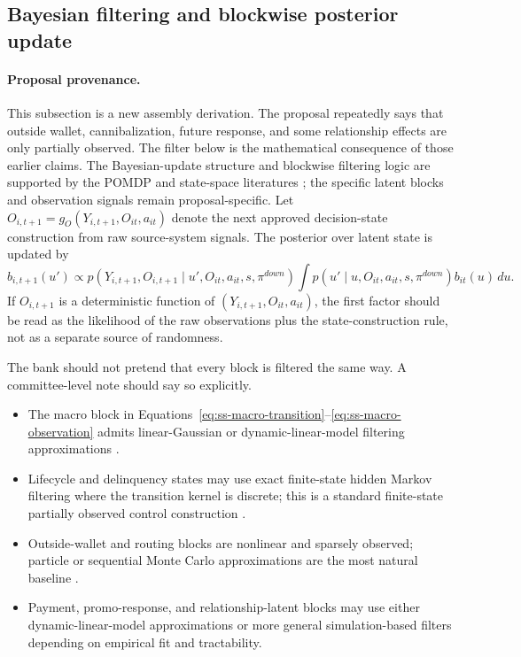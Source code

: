 \documentclass[11pt]{article}
\newcommand{\1}{\mathbf{1}}
\begin{document}
\subsection{Bayesian filtering and blockwise posterior update}
\label{subsec:state-space-filtering}

\paragraph{Proposal provenance.}
This subsection is a new assembly derivation. The proposal repeatedly says that
outside wallet, cannibalization, future response, and some relationship effects
are only partially observed. The filter below is the mathematical consequence of
those earlier claims. The Bayesian-update structure and blockwise filtering logic
are supported by the POMDP and state-space literatures
\citep{smallwood1973pomdp,kaelbling1998pomdp,durbinkoopman2012ssm,
westharrison1997bfdm,doucet2001smc}; the specific latent blocks and observation
signals remain proposal-specific. Let $O_{i,t+1}=g_O(Y_{i,t+1},O_{it},a_{it})$
denote the next approved decision-state construction from raw source-system
signals. The posterior over latent state is updated by
\begin{equation}
  b_{i,t+1}(u')
  \propto
  p(Y_{i,t+1},O_{i,t+1}\mid u',O_{it},a_{it},s,\pi^{down})
  \int p(u'\mid u,O_{it},a_{it},s,\pi^{down})b_{it}(u)\,du.
  \label{eq:ss-filter-update}
\end{equation}
If $O_{i,t+1}$ is a deterministic function of $(Y_{i,t+1},O_{it},a_{it})$, the
first factor should be read as the likelihood of the raw observations plus the
state-construction rule, not as a separate source of randomness.

The bank should not pretend that every block is filtered the same way. A
committee-level note should say so explicitly.
\begin{itemize}[leftmargin=*]
  \item The macro block in Equations~\eqref{eq:ss-macro-transition}--\eqref{eq:ss-macro-observation}
        admits linear-Gaussian or dynamic-linear-model filtering approximations
        \citep{durbinkoopman2012ssm,westharrison1997bfdm}.
  \item Lifecycle and delinquency states may use exact finite-state hidden
        Markov filtering where the transition kernel is discrete; this is a
        standard finite-state partially observed control construction
        \citep{smallwood1973pomdp,kaelbling1998pomdp}.
  \item Outside-wallet and routing blocks are nonlinear and sparsely observed;
        particle or sequential Monte Carlo approximations are the most natural
        baseline \citep{doucet2001smc}.
  \item Payment, promo-response, and relationship-latent blocks may use either
        dynamic-linear-model approximations or more general simulation-based
        filters depending on empirical fit and tractability.
\end{itemize}
\end{document}
